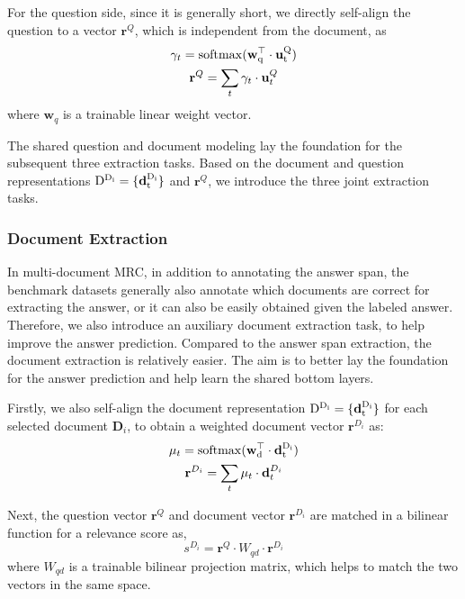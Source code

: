 \documentclass[letterpaper]{article} \usepackage{aaai19}  \usepackage{graphicx}
\begin{document}
For the question side, since it is generally short, we directly self-align the question to a vector ${\textbf{r}^Q}$, which is independent from the document, as
\begin{equation} \label{equ:6}
\begin{gathered}
{\gamma_t}=\rm{softmax}( \textbf{w}^\top_q\cdot \textbf{u}_t^Q)\\
{\textbf{r}^Q}=\sum_{t}\gamma_t \cdot \textbf{u}_t^Q
\end{gathered}
\end{equation}
where $\textbf{w}_q$ is a trainable linear weight vector. 

The shared question and document modeling lay the foundation for the subsequent three extraction tasks. Based on the document and question representations $\rm{D}^{D_i}=\{\textbf{d}_t^{D_i}\}$ and ${\textbf{r}^Q}$, we introduce the three joint extraction tasks.

\subsubsection{Document Extraction}
In multi-document MRC, in addition to annotating the answer span, the benchmark datasets generally also annotate which documents are correct for extracting the answer, or it can also be easily obtained given the labeled answer. Therefore, we also introduce an auxiliary document extraction task, to help improve the answer prediction. Compared to the answer span extraction, the document extraction is relatively easier. The aim is to better lay the foundation for the answer prediction and help learn the shared bottom layers.

Firstly, we also self-align the document representation $\rm{D}^{D_i}=\{\textbf{d}_t^{D_i}\}$ for each selected document $\textbf{D}_i$, to obtain a weighted document vector $\textbf{r}^{D_i} $ as:
\begin{equation} \label{equ:7}
\begin{gathered}
{\mu_t}=\rm{softmax}( \textbf{w}^\top_d\cdot \textbf{d}_t^{D_i})\\
{\textbf{r}^{D_i}}=\sum_{t}\mu_t \cdot \textbf{d}_t^{D_i}
\end{gathered}
\end{equation}

Next, the question vector ${\textbf{r}^Q}$ and document vector $\textbf{r}^{D_i}$ are matched in a bilinear function for a relevance score as,
\begin{equation} \label{equ:8}
s^{D_i}={\textbf{r}^Q}\cdot W_{qd}\cdot \textbf{r}^{D_i}
\end{equation}
where $W_{qd}$ is a trainable bilinear projection matrix, which helps to match the two vectors in the same space.
\end{document}

